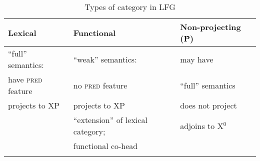 \documentclass[output=paper]{langsci/langscibook}
\begin{document}
\begin{table}
    \caption{Types of category in \gls{LFG}}
\label{Fig1LFGCats}
 \begin{tabular}{lll}
  \lsptoprule
       Lexical &Functional & Non-projecting (\^{P})\\
  \midrule
       \addlinespace[1ex] \enquote{full} semantics:  &    \enquote{weak} semantics:  &    may have     \\
      have \textsc{pred} feature &  no \textsc{pred} feature &  \enquote{full} semantics\\
     \addlinespace[1ex] projects to XP &   projects to XP &    does not project    \\ & \enquote{extension} of lexical category; & adjoins to X$^0$\\
         &  functional co-head & \\
  \lspbottomrule
 \end{tabular}
\end{table}
\end{document}
